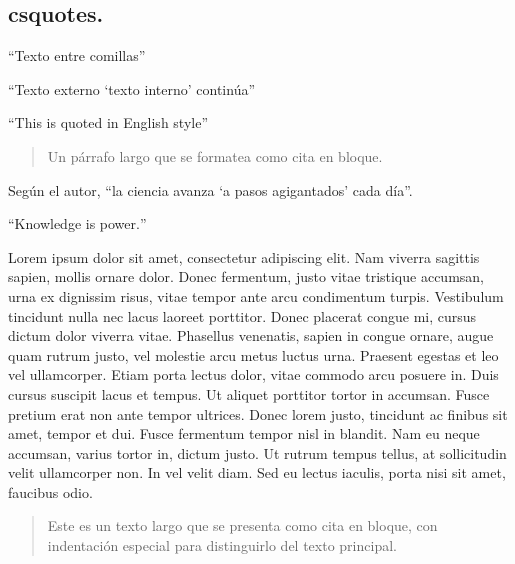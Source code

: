 	\subsection{csquotes.}
	
	\enquote{Texto entre comillas}
	
	\enquote{Texto externo \enquote{texto interno} continúa}
	
	\foreignquote{english}{This is quoted in English style}
	
	\blockquote{Un párrafo largo que se formatea como cita en bloque.}
	
	
	
	Según el autor, \enquote{la ciencia avanza \enquote{a pasos agigantados} cada día}.
	
	\foreignquote{english}{Knowledge is power.}
	
	Lorem ipsum dolor sit amet, consectetur adipiscing elit. Nam viverra sagittis sapien, mollis ornare dolor. Donec fermentum, justo vitae tristique accumsan, urna ex dignissim risus, vitae tempor ante arcu condimentum turpis. Vestibulum tincidunt nulla nec lacus laoreet porttitor. Donec placerat congue mi, cursus dictum dolor viverra vitae. Phasellus venenatis, sapien in congue ornare, augue quam rutrum justo, vel molestie arcu metus luctus urna. Praesent egestas et leo vel ullamcorper. Etiam porta lectus dolor, vitae commodo arcu posuere in. Duis cursus suscipit lacus et tempus. Ut aliquet porttitor tortor in accumsan. Fusce pretium erat non ante tempor ultrices. Donec lorem justo, tincidunt ac finibus sit amet, tempor et dui. Fusce fermentum tempor nisl in blandit. Nam eu neque accumsan, varius tortor in, dictum justo. Ut rutrum tempus tellus, at sollicitudin velit ullamcorper non. In vel velit diam. Sed eu lectus iaculis, porta nisi sit amet, faucibus odio.
	
	\blockquote{Este es un texto largo que se presenta como cita en bloque,	con indentación especial para distinguirlo del texto principal.}
	
